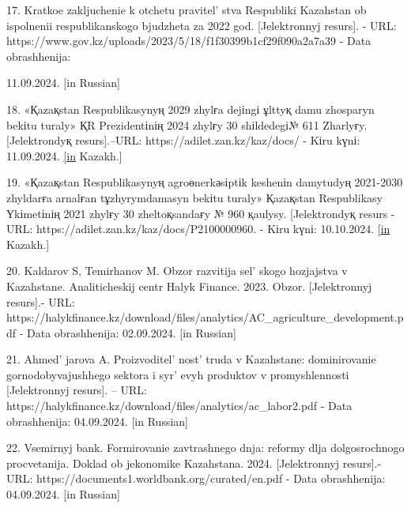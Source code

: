 \begin{references}
17. Kratkoe zakljuchenie k otchetu pravitel' stva
Respubliki Kazahstan ob ispolnenii respublikanskogo bjudzheta za 2022
god. {[}Jelektronnyj resurs{]}. - URL:
https://www.gov.kz/uploads/2023/5/18/f1f30399b1cf29f090a2a7a39 - Data
obrashhenija:

11.09.2024. {[}in Russian{]}

18. «Қazaқstan Respublikasynyң 2029 zhylғa dejіngі ұlttyқ damu zhosparyn
bekіtu turaly» ҚR Prezidentіnің 2024 zhylғy 30 shіldedegі№ 611 Zharlyғy.
{[}Jelektrondyқ resurs{]}.--URL: https://adilet.zan.kz/kaz/docs/ - Kіru
kүnі: 11.09.2024.
\href{https://kaz.zakon.kz/kogam-tynysy/6048484.\%20\%20\%20\%5bin}{{[}in}
Kazakh.{]}

19. «Қazaқstan Respublikasynyң agroөnerkәsіptіk keshenіn damytudyң
2021-2030 zhyldarғa arnalғan tұzhyrymdamasyn bekіtu turaly» Қazaқstan
Respublikasy Үkіmetіnің 2021 zhylғy 30 zheltoқsandaғy № 960 қaulysy.
{[}Jelektrondyқ resurs - URL:
https://adilet.zan.kz/kaz/docs/P2100000960. - Kіru kүnі: 10.10.2024.
\href{https://kaz.zakon.kz/kogam-tynysy/6048484.\%20\%20\%20\%5bin}{{[}in}
Kazakh.{]}

20. Kaldarov S, Temirhanov M. Obzor razvitija sel' skogo
hozjajstva v Kazahstane. Analiticheskij centr Halyk Finance. 2023.
Obzor. {[}Jelektronnyj resurs{]}.- URL:
https://halykfinance.kz/download/files/analytics/AC\_agriculture\_development.pdf
- Data obrashhenija: 02.09.2024. {[}in Russian{]}

21. Ahmed' jarova A.
Proizvoditel' nost'{} truda v Kazahstane:
dominirovanie gornodobyvajushhego sektora i syr' evyh
produktov v promyshlennosti {[}Jelektronnyj resurs{]}. -- URL:
https://halykfinance.kz/download/files/analytics/ac\_labor2.pdf - Data
obrashhenija: 04.09.2024. {[}in Russian{]}

22. Vsemirnyj bank. Formirovanie zavtrashnego dnja: reformy dlja
dolgosrochnogo procvetanija. Doklad ob jekonomike Kazahstana. 2024.
{[}Jelektronnyj resurs{]}.- URL:
https://documents1.worldbank.org/curated/en.pdf - Data obrashhenija:
04.09.2024. {[}in Russian{]}
\end{references}

